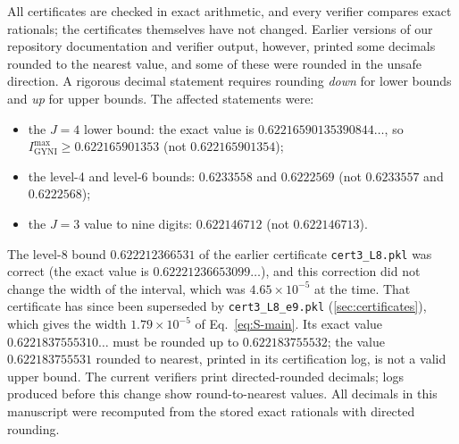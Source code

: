 \documentclass[aps,pra,onecolumn,notitlepage,superscriptaddress,longbibliography,nofootinbib,11pt]{revtex4-2}
\theoremstyle{remark}
\newcommand{\Imax}{I_{\mathrm{GYNI}}^{\max}}
\newcommand{\file}[1]{\texttt{#1}}
\begin{document}
All certificates are checked in exact arithmetic, and every verifier compares exact rationals; the certificates themselves have not changed. Earlier versions of our repository documentation and verifier output, however, printed some decimals rounded to the nearest value, and some of these were rounded in the unsafe direction. A rigorous decimal statement requires rounding \emph{down} for lower bounds and \emph{up} for upper bounds. The affected statements were:
\begin{itemize}
\item the $J=4$ lower bound: the exact value is $0.62216590135390844\ldots$, so $\Imax\ge0.622165901353$ (not $0.622165901354$);
\item the level-4 and level-6 bounds: $0.6233558$ and $0.6222569$ (not $0.6233557$ and $0.6222568$);
\item the $J=3$ value to nine digits: $0.622146712$ (not $0.622146713$).
\end{itemize}
The level-8 bound $0.622212366531$ of the earlier certificate \file{cert3\_L8.pkl} was correct (the exact value is $0.62221236653099\ldots$), and this correction did not change the width of the interval, which was $4.65\times10^{-5}$ at the time. That certificate has since been superseded by \file{cert3\_L8\_e9.pkl} (\ref{sec:certificates}), which gives the width $1.79\times10^{-5}$ of Eq.~\eqref{eq:S-main}. Its exact value $0.6221837555310\ldots$ must be rounded up to $0.622183755532$; the value $0.622183755531$ rounded to nearest, printed in its certification log, is not a valid upper bound. The current verifiers print directed-rounded decimals; logs produced before this change show round-to-nearest values. All decimals in this manuscript were recomputed from the stored exact rationals with directed rounding.


\end{document}
